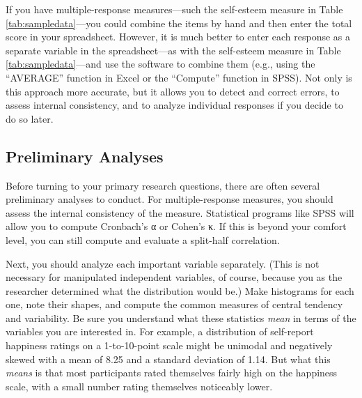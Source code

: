 \documentclass[
]{krantz}
\begin{document}
If you have multiple-response measures---such the self-esteem measure in Table \ref{tab:sampledata}---you could combine the items by hand and then enter the total score in your spreadsheet. However, it is much better to enter each response as a separate variable in the spreadsheet---as with the self-esteem measure in Table \ref{tab:sampledata}---and use the software to combine them (e.g., using the ``AVERAGE'' function in Excel or the ``Compute'' function in SPSS). Not only is this approach more accurate, but it allows you to detect and correct errors, to assess internal consistency, and to analyze individual responses if you decide to do so later.

\subsection*{Preliminary Analyses}\label{preliminary-analyses}


Before turning to your primary research questions, there are often several preliminary analyses to conduct. For multiple-response measures, you should assess the internal consistency of the measure. Statistical programs like SPSS will allow you to compute Cronbach's α or Cohen's κ. If this is beyond your comfort level, you can still compute and evaluate a split-half correlation.

Next, you should analyze each important variable separately. (This is not necessary for manipulated independent variables, of course, because you as the researcher determined what the distribution would be.) Make histograms for each one, note their shapes, and compute the common measures of central tendency and variability. Be sure you understand what these statistics \emph{mean} in terms of the variables you are interested in. For example, a distribution of self-report happiness ratings on a 1-to-10-point scale might be unimodal and negatively skewed with a mean of 8.25 and a standard deviation of 1.14. But what this \emph{means} is that most participants rated themselves fairly high on the happiness scale, with a small number rating themselves noticeably lower.
\end{document}
